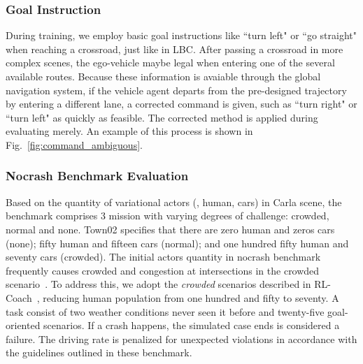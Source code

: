 \subsubsection{Goal Instruction} 
\hspace{1pc}During training, we employ basic goal instructions like ``turn left" or ``go straight" when reaching a crossroad, just like in LBC\cite{Codevilla:2019}.
After passing a crossroad in more complex scenes, the ego-vehicle maybe legal when entering one of the several available routes. 
Because these information is avaiable through the global navigation system, if the vehicle agent departs from the pre-designed trajectory by entering a different lane, a corrected command is given, such as ``turn right" or ``turn left" as quickly as feasible. 
The corrected method is applied during evaluating merely.
An example of this process is shown in Fig.~\ref{fig:command_ambiguous}.


\subsubsection{Nocrash Benchmark Evaluation}\label{nocrash_metrics}

\hspace{1pc}Based on the quantity of variational actors ({\ie}, human, cars) in Carla scene, the benchmark comprises 3 mission with varying degrees of challenge: crowded, normal and none.
Town02 specifies that there are zero human and zeros cars (none); fifty human and fifteen cars (normal); and one hundred fifty human and seventy cars (crowded).
%
The initial actors quantity in nocrash benchmark frequently causes crowded and congestion at intersections in the crowded scenario~\cite{Zhang:2021}.
To address this, we adopt the \emph{crowded} scenarios described in RL-Coach~\cite{Zhang:2021}, reducing human population from one hundred and fifty to seventy. 
A task consist of two weather conditions never seen it before and twenty-five goal-oriented scenarios.
If a crash happens, the simulated case ends is considered a failure.
The driving rate is penalized for unexpected violations in accordance with the guidelines outlined in these benchmark.


